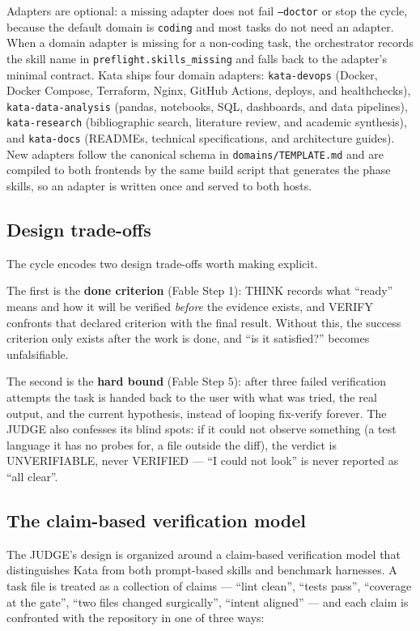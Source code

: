 \documentclass[11pt]{article}
\begin{document}
Adapters are optional: a missing adapter does not fail \texttt{--doctor}
or stop the cycle, because the default domain is \texttt{coding} and most
tasks do not need an adapter. When a domain adapter is missing for a
non-coding task, the orchestrator records the skill name in
\texttt{preflight.skills\_missing} and falls back to the adapter's minimal
contract. Kata ships four domain adapters: \texttt{kata-devops} (Docker,
Docker Compose, Terraform, Nginx, GitHub Actions, deploys, and
healthchecks), \texttt{kata-data-analysis} (pandas, notebooks, SQL,
dashboards, and data pipelines), \texttt{kata-research} (bibliographic
search, literature review, and academic synthesis), and \texttt{kata-docs}
(READMEs, technical specifications, and architecture guides). New adapters
follow the canonical schema in \texttt{domains/TEMPLATE.md} and are
compiled to both frontends by the same build script that generates the
phase skills, so an adapter is written once and served to both hosts.

\subsection{Design trade-offs}

The cycle encodes two design trade-offs worth making explicit.

The first is the \textbf{done criterion} (Fable Step 1): THINK records what
``ready'' means and how it will be verified \emph{before} the evidence
exists, and VERIFY confronts that declared criterion with the final result.
Without this, the success criterion only exists after the work is done, and
``is it satisfied?'' becomes unfalsifiable.

The second is the \textbf{hard bound} (Fable Step 5): after three failed
verification attempts the task is handed back to the user with what was
tried, the real output, and the current hypothesis, instead of looping
fix-verify forever. The JUDGE also confesses its blind spots: if it could
not observe something (a test language it has no probes for, a file outside
the diff), the verdict is UNVERIFIABLE, never VERIFIED --- ``I could not
look'' is never reported as ``all clear''.

\subsection{The claim-based verification model}

The JUDGE's design is organized around a claim-based verification model
that distinguishes Kata from both prompt-based skills and benchmark
harnesses. A task file is treated as a collection of claims --- ``lint
clean'', ``tests pass'', ``coverage at the gate'', ``two files changed
surgically'', ``intent aligned'' --- and each claim is confronted with the
repository in one of three ways:
\end{document}
